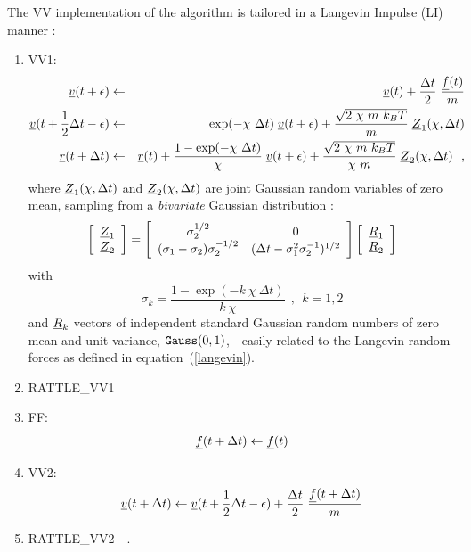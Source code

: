 The VV implementation of the algorithm is tailored in a Langevin
Impulse (LI) manner \cite{izaguirre-01a}:
\begin{enumerate}
\item VV1:
\begin{eqnarray}
\mbox{$\underline{v}$}(t + \epsilon) &\leftarrow& \mbox{$\underline{v}$}(t) +
{\Delta t \over 2} \; {\mbox{$\underline{f}$}(t) \over m} \nonumber \\
\mbox{$\underline{v}$}(t + {1 \over 2} \Delta t - \epsilon) &\leftarrow&
\exp(-\chi~\Delta t) \; \mbox{$\underline{v}$}(t + \epsilon) +
\frac{\sqrt{2~\chi~m~k_{B}T}}{m} \; \mbox{$\underline{Z}$}_{1}(\chi , \Delta t) \\
\mbox{$\underline{r}$}(t + \Delta t) &\leftarrow& \mbox{$\underline{r}$}(t) +
\frac{1-\exp(-\chi~\Delta t)}{\chi} \; \mbox{$\underline{v}$}(t + \epsilon) +
\frac{\sqrt{2~\chi~m~k_{B}T}}{\chi~m} \;
\mbox{$\underline{Z}$}_{2}(\chi , \Delta t)~~, \nonumber
\end{eqnarray}
where $\mbox{$\underline{Z}$}_{1}(\chi , \Delta t)$ and $\mbox{$\underline{Z}$}_{2}(\chi , \Delta
t)$ are joint Gaussian random variables of zero mean, sampling from
a {\em bivariate} Gaussian distribution \cite{izaguirre-01a}:
\begin{equation}
\left[
  \begin{array}{c}
    \mbox{$\underline{Z}$}_{1} \\
    \mbox{$\underline{Z}$}_{2} \\
  \end{array}
\right]
=
\left[
  \begin{array}{cc}
    \sigma_{2}^{1/2} & 0 \\
    (\sigma_{1} - \sigma_{2})\sigma_{2}^{-1/2} & (\Delta t - \sigma_{1}^{2}\sigma_{2}^{-1})^{1/2} \\
  \end{array}
\right]
\left[
  \begin{array}{c}
    \mbox{$\underline{R}$}_{1} \\
    \mbox{$\underline{R}$}_{2} \\
  \end{array}
\right]
\end{equation}
with
\begin{equation}
\sigma_{k} = \frac{1 - \exp(-k~\chi~\Delta t)}{k~\chi}~~,~~k=1,2
\end{equation}
and $\mbox{$\underline{R}$}_{k}$ vectors of independent standard Gaussian random
numbers of zero mean and unit variance, ${\tt Gauss}(0,1)$, -
easily related to the Langevin random forces as defined in equation~(\ref{langevin}).
\item RATTLE\_VV1
\item FF:
\begin{equation}
\mbox{$\underline{f}$}(t + \Delta t) \leftarrow \mbox{$\underline{f}$}(t)
\end{equation}
\item VV2:
\begin{equation}
\mbox{$\underline{v}$}(t + \Delta t) \leftarrow \mbox{$\underline{v}$}(t + {1 \over 2} \Delta t - \epsilon) +
{\Delta t \over 2} \; {\mbox{$\underline{f}$}(t + \Delta t) \over m}
\end{equation}
\item RATTLE\_VV2~~.
\end{enumerate}
